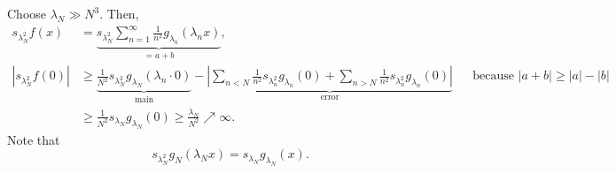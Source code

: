 \documentclass[letterpaper, reqno,11pt]{article}
\begin{document}
\noindent{}

\medskip

Choose $\lambda_N \gg N^3$. Then,
\begin{align*}
  s_{\lambda_N^2} f(x) &= \underbrace{s_{\lambda_N^2} \sum_{n = 1}^\infty \frac{1}{n^2} g_{\lambda_n} (\lambda_n x)}_{= a + b}, \\
  |s_{\lambda_N^2} f(0)| &\geq \underbrace{\frac{1}{N^2} s_{\lambda_N^2} g_{\lambda_N} (\lambda_n \cdot 0)}_\text{main} - \underbrace{\left|\sum_{n < N} \frac{1}{n^2} s_{\lambda_n^2} g_{\lambda_n}(0) + \sum_{n > N} \frac{1}{n^2} s_{\lambda_n^2} g_{\lambda_n}(0)\right|}_\text{error} && \text{because $|a + b| \geq |a| - |b|$} \\
  &\geq \frac{1}{N^2} s_{\lambda_N} g_{\lambda_N} (0) \geq \frac{\lambda_N}{N^2} \nearrow \infty.
\end{align*}
Note that
\[ s_{\lambda_N^2} g_N(\lambda_N x) = s_{\lambda_N} g_{\lambda_N} (x). \]
\end{document}
